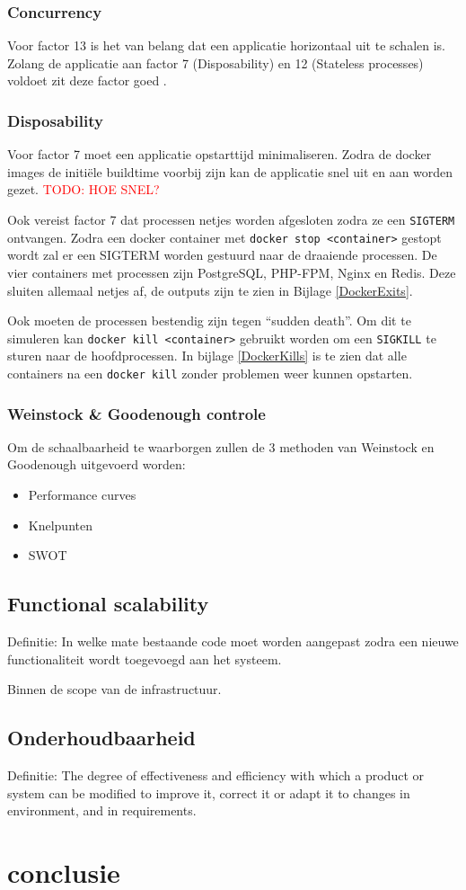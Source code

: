 \subsubsection{Concurrency}
Voor factor 13 is het van belang dat een applicatie horizontaal uit te schalen is. Zolang de applicatie aan factor 7 (Disposability) en 12 (Stateless processes) voldoet zit deze factor goed \parencite{Beyond12Factor}.

\subsubsection{Disposability}
Voor factor 7 moet een applicatie opstarttijd minimaliseren. Zodra de docker images de initiële buildtime voorbij zijn kan de applicatie snel uit en aan worden gezet. \textcolor{red}{TODO: HOE SNEL?} %

Ook vereist factor 7 dat processen netjes worden afgesloten zodra ze een \texttt{SIGTERM} ontvangen. Zodra een docker container met \texttt{docker stop <container>} gestopt wordt zal er een SIGTERM worden gestuurd naar de draaiende processen. De vier containers met processen zijn PostgreSQL, PHP-FPM, Nginx en Redis. Deze sluiten allemaal netjes af, de outputs zijn te zien in Bijlage \ref{DockerExits}.

Ook moeten de processen bestendig zijn tegen \enquote{sudden death}. Om dit te simuleren kan \texttt{docker kill <container>} gebruikt worden om een \texttt{SIGKILL} te sturen naar de hoofdprocessen. In bijlage \ref{DockerKills} is te zien dat alle containers na een \texttt{docker kill} zonder problemen weer kunnen opstarten.

\subsubsection{Weinstock \& Goodenough controle}
Om de schaalbaarheid te waarborgen zullen de 3 methoden van Weinstock en Goodenough \parencite{OnSystemScalability} uitgevoerd worden:

\begin{itemize}
	\item Performance curves
	\item Knelpunten
	\item SWOT
\end{itemize}


\subsection{Functional scalability}
Definitie: In welke mate bestaande code moet worden aangepast zodra een nieuwe functionaliteit wordt toegevoegd aan het systeem.

Binnen de scope van de infrastructuur.

\subsection{Onderhoudbaarheid}
Definitie: The degree of effectiveness and efficiency with which a product or system can be modified to improve it, correct it or adapt it to changes in environment, and in requirements.

\section{conclusie}
